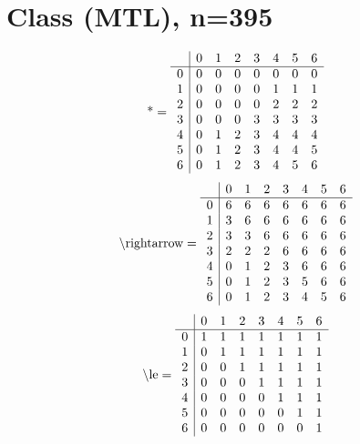 \documentclass[11pt]{article}
\begin{document}
\section{Class (MTL), n=395}
\[\text{*} = 
\begin{array}{r | r r r r r r r}
 & 0 & 1 & 2 & 3 & 4 & 5 & 6 \\ \hline
0 & 0 & 0 & 0 & 0 & 0 & 0 & 0 \\
1 & 0 & 0 & 0 & 0 & 1 & 1 & 1 \\
2 & 0 & 0 & 0 & 0 & 2 & 2 & 2 \\
3 & 0 & 0 & 0 & 3 & 3 & 3 & 3 \\
4 & 0 & 1 & 2 & 3 & 4 & 4 & 4 \\
5 & 0 & 1 & 2 & 3 & 4 & 4 & 5 \\
6 & 0 & 1 & 2 & 3 & 4 & 5 & 6 \\
\end{array}
\]
\[\text{\textbackslash rightarrow} = 
\begin{array}{r | r r r r r r r}
 & 0 & 1 & 2 & 3 & 4 & 5 & 6 \\ \hline
0 & 6 & 6 & 6 & 6 & 6 & 6 & 6 \\
1 & 3 & 6 & 6 & 6 & 6 & 6 & 6 \\
2 & 3 & 3 & 6 & 6 & 6 & 6 & 6 \\
3 & 2 & 2 & 2 & 6 & 6 & 6 & 6 \\
4 & 0 & 1 & 2 & 3 & 6 & 6 & 6 \\
5 & 0 & 1 & 2 & 3 & 5 & 6 & 6 \\
6 & 0 & 1 & 2 & 3 & 4 & 5 & 6 \\
\end{array}
\]
\[\text{\textbackslash le} = 
\begin{array}{r | r r r r r r r}
 & 0 & 1 & 2 & 3 & 4 & 5 & 6 \\ \hline
0 & 1 & 1 & 1 & 1 & 1 & 1 & 1 \\
1 & 0 & 1 & 1 & 1 & 1 & 1 & 1 \\
2 & 0 & 0 & 1 & 1 & 1 & 1 & 1 \\
3 & 0 & 0 & 0 & 1 & 1 & 1 & 1 \\
4 & 0 & 0 & 0 & 0 & 1 & 1 & 1 \\
5 & 0 & 0 & 0 & 0 & 0 & 1 & 1 \\
6 & 0 & 0 & 0 & 0 & 0 & 0 & 1 \\
\end{array}
\]
\end{document}
